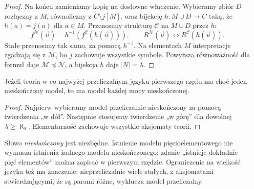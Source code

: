 \begin{proof}
Na końcu zamieniamy kopię na dosłowne włączenie. Wybieramy zbiór $D$ rozłączny z $M$, równoliczny z $C\setminus j[M]$, oraz bijekcję $h:M\cup D\to C$ taką, że $h(a)=j(a)$ dla $a\in M$. Przenosimy strukturę $\mathcal C$ na $M\cup D$ przez $h$:
\[
f^{\mathcal N}(\vec u)=h^{-1}(f^{\mathcal C}(h(\vec u))),\qquad
R^{\mathcal N}(\vec u)\Longleftrightarrow R^{\mathcal C}(h(\vec u)).
\]
Stałe przenosimy tak samo, za pomocą $h^{-1}$. Na elementach $M$ interpretacje zgadzają się z $\mathcal M$, bo $j$ zachowuje wszystkie symbole. Powyższa równoważność dla formuł daje $\mathcal M\preccurlyeq\mathcal N$, a bijekcja $h$ daje $|N|=\lambda$.
\end{proof}

\begin{wniosek}\label{res:14:10}
Jeżeli teoria w co najwyżej przeliczalnym języku pierwszego rzędu ma choć jeden nieskończony model, to ma model każdej mocy nieskończonej.
\end{wniosek}
\begin{proof}
Najpierw wybieramy model przeliczalnie nieskończony za pomocą twierdzenia „w dół”. Następnie stosujemy twierdzenie „w górę” dla dowolnej $\lambda\ge\aleph_0$. Elementarność zachowuje wszystkie aksjomaty teorii.
\end{proof}

\begin{uwaga}\label{res:14:11}
Słowo \emph{nieskończony} jest niezbędne. Istnienie modelu pięcioelementowego nie wymusza istnienia żadnego modelu nieskończonego: zdanie „istnieje dokładnie pięć elementów” można zapisać w pierwszym rzędzie. Ograniczenie na wielkość języka też ma znaczenie: nieprzeliczalnie wiele stałych, z aksjomatami stwierdzającymi, że są parami różne, wyklucza model przeliczalny.
\end{uwaga}

